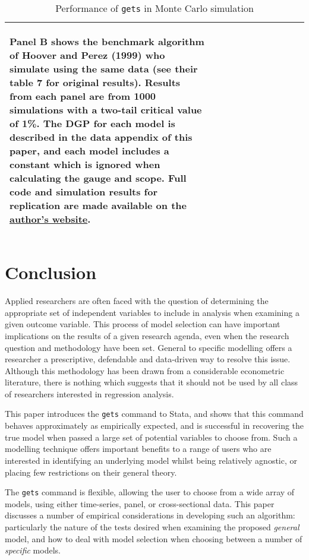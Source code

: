 \documentclass[bib]{statapress}
\begin{document}
\begin{landscape}
\begin{table}[h!]
\begin{tabular}{l c c c c c c c c c c}
{\begin{footnotesize}
Panel B shows the benchmark algorithm of Hoover and Perez (1999) who simulate 
using the same data (see their table 7 for original results).  Results from 
each panel are from 1000 simulations with a two-tail critical value of 1\%.  
The DGP for each model is described in the data appendix of this paper, and 
each model includes a constant which is ignored when calculating the gauge and
scope.  Full code and simulation results for replication are made available on
the \href{https://sites.google.com/site/damiancclarke/research}{author's website}.
\end{footnotesize}} \\ \midrule
\end{tabular}
\caption{Performance of \texttt{gets} in Monte Carlo simulation}
\label{tab:perf}
\end{table}
\end{landscape}

\section{Conclusion}
Applied researchers are often faced with the question of determining the 
appropriate set of independent variables to include in analysis when examining
a given outcome variable.  This process of model selection can have important 
implications on the results of a given research agenda, even when the research 
question and methodology have been set.  General to specific modelling offers
a researcher a prescriptive, defendable and data-driven way to resolve this
issue.  Although this methodology has been drawn from a considerable 
econometric literature, there is nothing which suggests that it should not be
used by all class of researchers interested in regression analysis.

This paper introduces the \texttt{gets} command to Stata, and shows that this 
command behaves approximately as empirically expected, and is successful in 
recovering the true model when passed a large set of potential variables to 
choose from.  Such a modelling technique offers important benefits to a range
of users who are interested in identifying an underlying model whilst being 
relatively agnostic, or placing few restrictions on their general theory.

The \texttt{gets} command is flexible, allowing the user to choose from a wide
array of models, using either time-series, panel, or cross-sectional data.  
This paper discusses a number of empirical considerations in developing such an
algorithm: particularly the nature of the tests desired when examining the 
proposed \emph{general} model, and how to deal with model selection when 
choosing between a number of \emph{specific} models.
\end{document}
